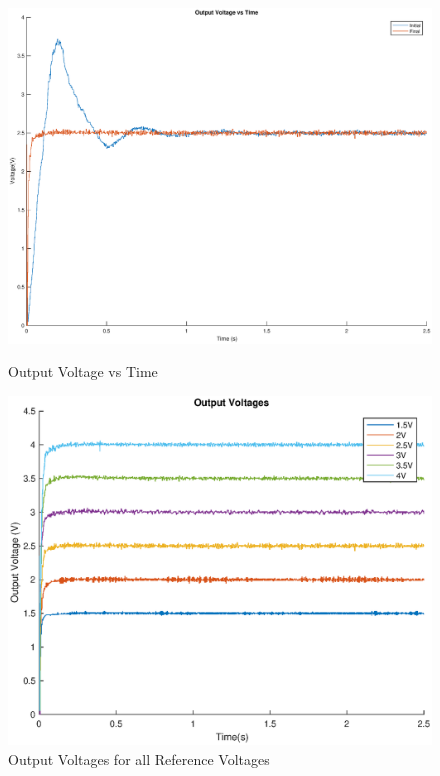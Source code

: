 \documentclass[a4paper]{article}
\begin{document}
\begin{figure}[H]
    \centering
    \begin{minipage}{.4\textwidth}
        \centering
        \includegraphics[scale=0.178]{./media/initialvsfinal.eps}
        \caption{Output Voltage vs Time}
        \label{graph:PIDController}
    \end{minipage}%
    \begin{minipage}{.6\textwidth}
        \centering
        \includegraphics[scale=0.35]{./media/allvoltages.eps}
        \caption{Output Voltages for all Reference Voltages }
        \label{graph:Output Voltages}
    \end{minipage}
\end{figure}
\end{document}

